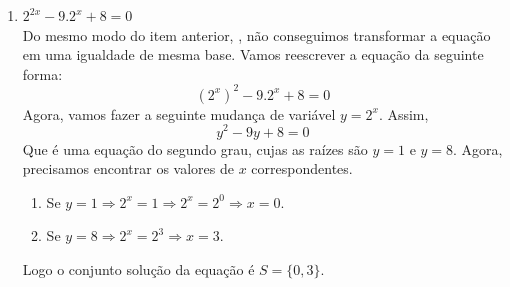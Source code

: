 \begin{exe}
\begin{enumerate}
    \item $2^{2x}-9.2^x+8=0$ \\
    \color{red}
    Do mesmo modo do item anterior, , não conseguimos transformar a equação em uma igualdade de mesma base. Vamos reescrever a equação da seguinte forma:
    $$(2^x)^2-9.2^x+8=0$$
    Agora, vamos fazer a seguinte mudança de variável $y=2^x$. Assim,
    $$y^2-9y+8=0$$
    Que é uma equação do segundo grau, cujas as raízes são $y=1$ e $y=8$. Agora, precisamos encontrar os valores de $x$ correspondentes.
    \begin{enumerate}
        \item Se $y=1 \Longrightarrow 2^x=1 \Longrightarrow 2^x=2^0 \Longrightarrow x=0$.
        \item Se $y=8 \Longrightarrow 2^x=2^3 \Longrightarrow x=3$.
    \end{enumerate}
    Logo o conjunto solução da equação é $S=\{0,3 \}$.
    \color{black}
    \end{enumerate}
    \end{exe}
